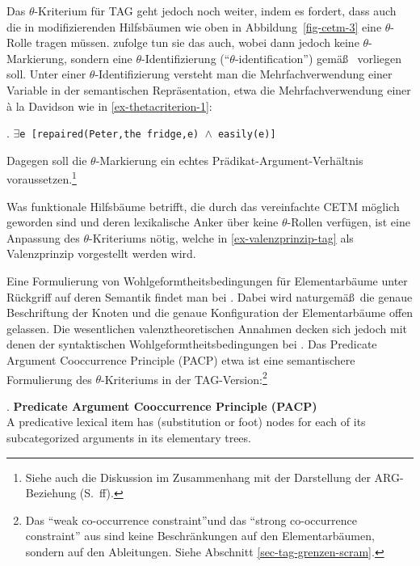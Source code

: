 Das $\theta$-Kriterium für TAG geht jedoch noch weiter, indem es fordert, dass auch die  in modifizierenden Hilfsbäumen wie oben in Abbildung~\ref{fig-cetm-3} eine $\theta$-Rolle tragen müssen. \citet[63f]{Frank:02} zufolge tun sie das auch, wobei dann jedoch keine $\theta$-Markierung, sondern eine $\theta$-Identifizierung ("`$\theta$-identification"') gemä\ss\ \citet[564]{Higginbotham:85} vorliegen soll. Unter einer $\theta$-Identifizierung versteht man die Mehrfachverwendung einer Variable in der semantischen Repräsentation, etwa die Mehrfachverwendung einer  \`a la Davidson wie in \ref{ex-thetacriterion-1}:

\ex. \label{ex-thetacriterion-1} {\tt $\exists$e [repaired(Peter,the fridge,e) $\wedge$ easily(e)]}

Dagegen soll die $\theta$-Markierung ein echtes Prädikat-Argument-Verhältnis voraussetzen.\footnote{Siehe auch die Diskussion im Zusammenhang mit der Darstellung der ARG-Beziehung (S.~\pageref{sec-arg}ff).}

Was funktionale Hilfsbäume betrifft, die durch das vereinfachte CETM möglich geworden sind und deren lexikalische Anker über keine $\theta$-Rollen verfügen, ist eine Anpassung des $\theta$-Kriteriums nötig, welche in \ref{ex-valenzprinzip-tag} als Valenzprinzip vorgestellt werden wird. 

Eine Formulierung von Wohlgeformtheitsbedingungen für Elementarbäume unter Rückgriff auf deren Semantik findet man bei \citet[21f]{Abeille:Rambow:00}. Dabei wird naturgemä\ss \ die genaue Beschriftung der Knoten und die genaue Konfiguration der Elementarbäume offen gelassen. Die wesentlichen valenztheoretischen Annahmen decken sich jedoch mit denen der syntaktischen Wohlgeformtheitsbedingungen bei \cite{Frank:02}. Das Predicate Argument Co\-occurrence Principle (PACP) etwa ist eine semantischere Formulierung des $\theta$-Kriteriums in der TAG-Version:\footnote{Das "`weak co-occurrence constraint"'und das "`strong co-occurrence constraint"' aus \cite{Joshi:Becker:Rambow:00} sind keine Beschränkungen auf den Elementarbäumen, sondern auf den Ableitungen. Siehe Abschnitt \ref{sec-tag-grenzen-scram}.} 

\ex. {\bf Predicate Argument Cooccurrence Principle (PACP)} \\
A predicative lexical item has (substitution or foot) nodes for each of its subcategorized arguments in its elementary trees. 

